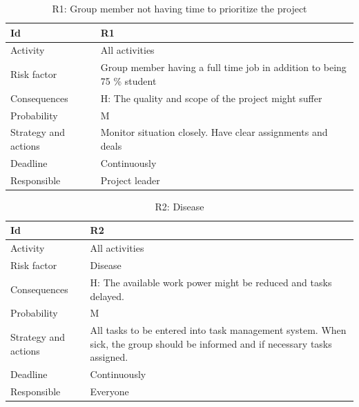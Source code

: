 \documentclass[11pt]{book}
\begin{document}
\begin{table}[H]
\centering
\begin{tabular}{ l  p{11cm} }
    Id                      & R1                                                                          \\ \hline
    Activity                & All activities                                                              \\ \hline
    Risk factor             & Group member having a full time job in addition to being 75 \% student      \\ \hline
    Consequences            & H: The quality and scope of the project might suffer                        \\ \hline
    Probability             & M                                                                           \\ \hline
    Strategy and actions    & Monitor situation closely. Have clear assignments and deals                 \\ \hline
    Deadline                & Continuously                                                                \\ \hline
    Responsible             & Project leader                                                              \\ 
\end{tabular}
\caption{R1: Group member not having time to prioritize the project}
\label{tab:risk_1}
\end{table}

\begin{table}[H]
\centering
\begin{tabular}{ l  p{11cm} }
    Id                      & R2                                                                          \\ \hline
    Activity                & All activities                                                              \\ \hline
    Risk factor             & Disease                                                                     \\ \hline
    Consequences            & H: The available work power might be reduced and tasks delayed.             \\ \hline
    Probability             & M                                                                           \\ \hline
    Strategy and actions    & All tasks to be entered into task management system. 
                              When sick, the group should be informed and if necessary tasks assigned.    \\ \hline
    Deadline                & Continuously                                                                \\ \hline
    Responsible             & Everyone\\
\end{tabular}
\caption{R2: Disease}
\label{tab:risk_2}
\end{table}
\end{document}

